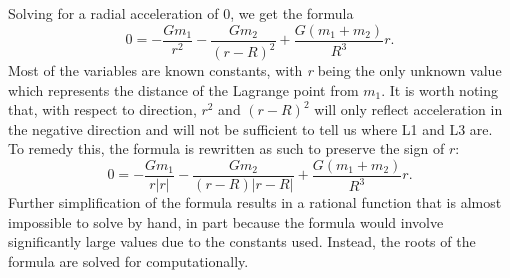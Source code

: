 \documentclass[12pt]{article}
\begin{document}
	Solving for a radial acceleration of 0, we get the formula
	\begin{equation}
		0 = -\frac{Gm_1}{r^2} - \frac{Gm_2}{(r - R)^2} + \frac{G(m_1+m_2)}{R^3}r \text{.}
	\end{equation}
	Most of the variables are known constants, with \textit{r} being the only unknown value which represents the distance of the Lagrange point from $m_1$.
	It is worth noting that, with respect to direction, $r^2$ and $(r-R)^2$ will only reflect acceleration in the negative direction and will not be sufficient to tell us where L1 and L3 are.
	To remedy this, the formula is rewritten as such to preserve the sign of $r$:
	\begin{equation}
		0 = -\frac{Gm_1}{r|r|} - \frac{Gm_2}{(r - R)|r - R|} + \frac{G(m_1+m_2)}{R^3}r \text{.}
	\end{equation}
	Further simplification of the formula results in a rational function that is almost impossible to solve by hand, in part because the formula would involve significantly large values due to the constants used.
	Instead, the roots of the formula are solved for computationally.
\end{document}
